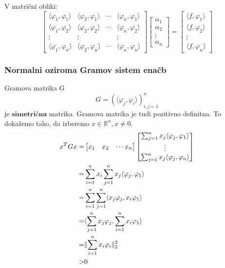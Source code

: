 \documentclass[a4paper,12pt]{article}
\DeclarePairedDelimiter\norm{\lVert}{\rVert}
\newcommand{\innerproduct}[2]{\langle #1, #2 \rangle}
\theoremstyle{definition}
\theoremstyle{remark}
\newcommand{\R}{\mathbb{R}}
\begin{document}
V matrični obliki:
\begin{equation*}
    \begin{bmatrix}
        \innerproduct{\varphi_1}{\varphi_1} & \innerproduct{\varphi_2}{\varphi_1} & \cdots & \innerproduct{\varphi_n}{\varphi_1} \\
        \innerproduct{\varphi_1}{\varphi_2} & \innerproduct{\varphi_2}{\varphi_2} & \cdots & \innerproduct{\varphi_n}{\varphi_2} \\
        \vdots & \vdots & & \vdots \\
        \innerproduct{\varphi_1}{\varphi_n} & \innerproduct{\varphi_2}{\varphi_n} & \cdots & \innerproduct{\varphi_n}{\varphi_n}
    \end{bmatrix}
    \begin{bmatrix}
        \alpha_1 \\
        \alpha_2 \\
        \vdots \\
        \alpha_n
    \end{bmatrix}
    =
    \begin{bmatrix}
        \innerproduct{f}{\varphi_1}\\
        \innerproduct{f}{\varphi_2}\\
        \vdots \\
        \innerproduct{f}{\varphi_n}
    \end{bmatrix}
\end{equation*}

\subsubsection{Normalni oziroma Gramov sistem enačb}
Gramova matrika G
\begin{equation*}
    G = (\innerproduct{\varphi_j}{\varphi_i})_{i, j = 1}^n
\end{equation*}
je $\textbf{simetrična}$ matrika. Gramova matrika je tudi pozitivno definitna. To dokažemo tako, da izberemo $x \in \R^n, x \neq 0$.
\begin{align}
    x^T G x =&
    \begin{bmatrix}
        x_1 & x_2 & \cdots x_n
    \end{bmatrix}
    \begin{bmatrix}
        \sum_{j = 1}^{n} x_j \innerproduct{\varphi_j}{\varphi_1} \\
        \vdots \\
        \sum_{j = 1}^{n} x_j \innerproduct{\varphi_j}{\varphi_n}
    \end{bmatrix} \nonumber \\
    =& \sum_{i = 1}^{n} x_i \sum_{j = 1}^{n} x_j \innerproduct{\varphi_j}{\varphi_1} \nonumber \\
    =& \sum_{i = 1}^{n} \sum_{j = 1}^{n} \innerproduct{x_j \varphi_j}{x_i \varphi_1} \nonumber \\
    =& \innerproduct{\sum_{j = 1}^{n} x_j \varphi_j}{\sum_{i = 1}^{n} x_i \varphi_1} \nonumber\\
    =& \norm{\sum_{i = 1}^{n} x_i \varphi_i}_2^2 \nonumber \\
    >& 0 \label{eq:grammNeenacaj}
\end{align}
\end{document}

